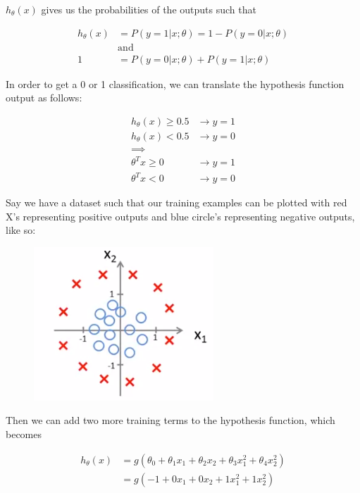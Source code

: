 \documentclass{article}
\begin{document}
        \noindent $h_{\theta}(x)$ gives us the probabilities of the outputs such that

        \begin{align*}
            h_{\theta}(x)   &= P(y=1|x;\theta) = 1 - P(y=0|x;\theta) \\
                            & \text{and} \\
            1               &= P(y=0|x;\theta) + P(y=1|x;\theta)
        \end{align*}

        \noindent In order to get a 0 or 1 classification, we can translate the hypothesis function output as
        follows:

        \begin{align*}
            h_{\theta}(x) \geq 0.5 &\to y=1 \\
            h_{\theta}(x) < 0.5    &\to y=0 \\
            \implies \\
            \theta^T x \geq 0  &\to y=1 \\
            \theta^T x < 0     &\to y=0
        \end{align*}

        \noindent Say we have a dataset such that our training examples can be plotted with red X's
        representing positive outputs and blue circle's representing negative outputs, like so:

        \begin{figure}[hbt!]
            \centering
            \includegraphics{Resources/Decision_Boundary}
        \end{figure}

        \noindent Then we can add two more training terms to the hypothesis function, which becomes

        \begin{align*}
            h_{\theta}(x)   &= g(\theta_0 + \theta_1 x_1 + \theta_2 x_2 + \theta_3 x_1^2 + \theta_4 x_2^2) \\
                            &= g(-1 + 0x_1 + 0x_2 + 1x_1^2 + 1x_2^2)
        \end{align*}
\end{document}
